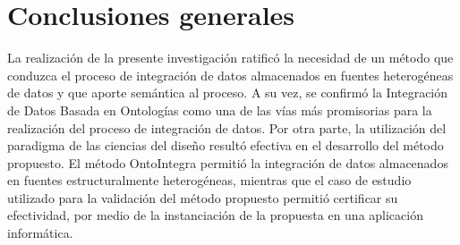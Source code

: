 \chapter*{\large Conclusiones generales}



La realización de la presente investigación ratificó la necesidad de un método que conduzca el proceso de integración de datos almacenados en fuentes heterogéneas de datos y que aporte semántica al proceso. A su vez, se confirmó la Integración de Datos Basada en Ontologías como una de las vías más promisorias para la realización del proceso de integración de datos. Por otra parte, la utilización del paradigma de las ciencias del diseño resultó efectiva en el desarrollo del método propuesto. El método OntoIntegra permitió la integración de datos almacenados en fuentes estructuralmente heterogéneas, mientras que el caso de estudio utilizado para la validación del método propuesto permitió certificar su efectividad, por medio de la instanciación de la propuesta en una aplicación informática.
